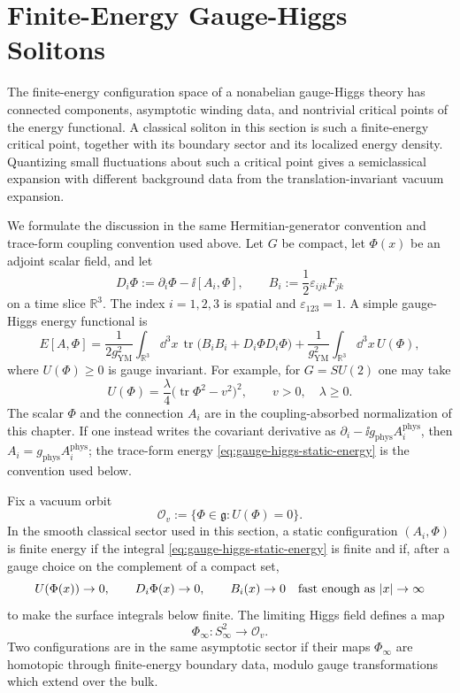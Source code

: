 \section{Finite-Energy Gauge-Higgs Solitons}
\label{sec:gauge-higgs-classical-solitons}

The finite-energy configuration space of a nonabelian gauge-Higgs theory has
connected components, asymptotic winding data, and nontrivial critical points
of the energy functional.  A classical soliton in this section is such a
finite-energy critical point, together with its boundary sector and its
localized energy density.  Quantizing small fluctuations about such a critical
point gives a semiclassical expansion with different background data from the
translation-invariant vacuum expansion.

We formulate the discussion in the same Hermitian-generator convention and
trace-form coupling convention used above.  Let \(G\) be compact, let
\(\Phi(x)\) be an adjoint scalar field, and let
\[
  D_i\Phi:=\partial_i\Phi-\ii[A_i,\Phi],
  \qquad
  B_i:=\frac12\varepsilon_{ijk}F_{jk}
\]
on a time slice \(\mathbb R^3\).  The index \(i=1,2,3\) is spatial and
\(\varepsilon_{123}=1\).  A simple gauge-Higgs energy functional is
\begin{equation}
  E[A,\Phi]
  =
  \frac1{2g_{\mathrm{YM}}^2}
  \int_{\mathbb R^3}\dd^3x\,
  \operatorname{tr}\bigl(B_iB_i+D_i\Phi D_i\Phi\bigr)
  +
  \frac1{g_{\mathrm{YM}}^2}
  \int_{\mathbb R^3}\dd^3x\,U(\Phi),
  \label{eq:gauge-higgs-static-energy}
\end{equation}
where \(U(\Phi)\ge 0\) is gauge invariant.  For example, for
\(G=SU(2)\) one may take
\[
  U(\Phi)=\frac\lambda4\bigl(\operatorname{tr}\Phi^2-v^2\bigr)^2,
  \qquad
  v>0,\quad \lambda\ge 0.
\]
The scalar \(\Phi\) and the connection \(A_i\) are in the coupling-absorbed
normalization of this chapter.  If one instead writes the covariant derivative
as \(\partial_i-\ii g_{\mathrm{phys}}A^{\mathrm{phys}}_i\), then
\(A_i=g_{\mathrm{phys}}A_i^{\mathrm{phys}}\); the trace-form energy
\eqref{eq:gauge-higgs-static-energy} is the convention used below.

\begin{definition}
\label{def:smooth-finite-energy-gauge-higgs-sector}
Fix a vacuum orbit
\[
  \mathcal O_v:=\{\Phi\in\mathfrak g:U(\Phi)=0\}.
\]
In the smooth classical sector used in this section, a static configuration
\((A_i,\Phi)\) is finite energy if the integral
\eqref{eq:gauge-higgs-static-energy} is finite and if, after a gauge choice on
the complement of a compact set,
\[
  U(\Phi(x))\to 0,\qquad
  D_i\Phi(x)\to 0,\qquad
  B_i(x)\to 0
  \quad
  \hbox{fast enough as }|x|\to\infty
\]
to make the surface integrals below finite.  The limiting Higgs field defines
a map
\[
  \Phi_\infty:S^2_\infty\longrightarrow \mathcal O_v .
\]
Two configurations are in the same asymptotic sector if their maps
\(\Phi_\infty\) are homotopic through finite-energy boundary data, modulo
gauge transformations which extend over the bulk.
\end{definition}

